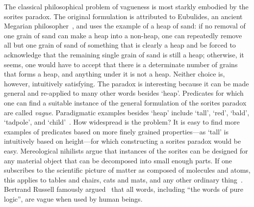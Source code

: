 \documentclass[a4paper]{article}
\begin{document}
The classical philosophical problem of vagueness is most starkly embodied by the sorites paradox.
The original formulation is attributed to Eubulides, an ancient Megarian philosopher~\parencite{sorensen_sorites_2009}, and uses the example of a heap of sand: if no removal of one grain of sand can make a heap into a non-heap, one can repeatedly remove all but one grain of sand of something that is clearly a heap and be forced to acknowledge that the remaining single grain of sand is still a heap; otherwise, it seems, one would have to accept that there is a determinate number of grains that forms a heap, and anything under it is not a heap.
Neither choice is, however, intuitively satisfying.
The paradox is interesting because it can be made general and re-applied to many other words besides `heap'.
Predicates for which one can find a suitable instance of the general formulation of the sorites paradox are called \emph{vague}.
Paradigmatic examples besides `heap' include `tall', `red', `bald', `tadpole', and `child'~\parencite{Keefe1997}.
How widespread is the problem?
It is easy to find more examples of predicates based on more finely grained properties---as `tall' is intuitively based on height---for which constructing a sorites paradox would be easy.
Mereological nihilists argue that instances of the sorites can be designed for any material object that can be decomposed into small enough parts.
If one subscribes to the scientific picture of matter as composed of molecules and atoms, this applies to tables and chairs, cats and mats, and any other ordinary thing~\parencite{Unger1979}.
Bertrand Russell famously argued~\parencite*{russell_vagueness_1923} that all words, including ``the words of pure logic'', are vague when used by human beings.
\end{document}
